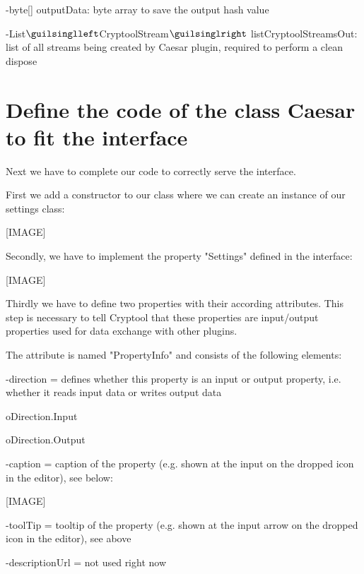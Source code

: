 \hspace{20pt}-byte[] outputData: byte array to save the output hash value

\hspace{20pt}-List$\guilsinglleft$CryptoolStream$\guilsinglright$ listCryptoolStreamsOut: list of all streams being created by Caesar plugin, required to perform a clean dispose


\section{Define the code of the class Caesar to fit the interface}\label{sec:DefineTheCodeOfTheClassMD5ToFitTheInterface}
Next we have to complete our code to correctly serve the interface.

First we add a constructor to our class where we can create an instance of our settings class:

[IMAGE]

Secondly, we have to implement the property "Settings" defined in the interface:

[IMAGE]

Thirdly we have to define two properties with their according attributes. This step is necessary to tell Cryptool that these properties are input/output properties used for data exchange with other plugins.

The attribute is named "PropertyInfo" and consists of the following elements:

\hspace{20pt}-direction = defines whether this property is an input or output property, i.e. whether it reads input data or writes output data

\hspace{30pt}o\hspace{10pt}Direction.Input

\hspace{30pt}o\hspace{10pt}Direction.Output

\hspace{20pt}-caption = caption of the property (e.g. shown at the input on the dropped icon in the editor), see below:

[IMAGE]

\hspace{20pt}-toolTip = tooltip of the property (e.g. shown at the input arrow on the dropped icon in the editor), see above

\hspace{20pt}-descriptionUrl = not used right now

